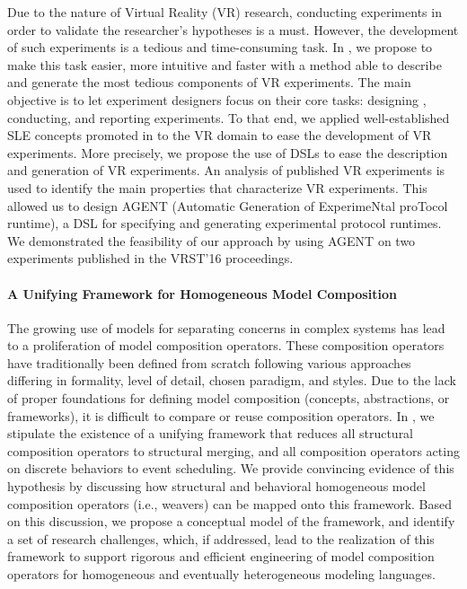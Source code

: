 Due to the nature of Virtual Reality (VR) research, conducting experiments in order to validate the researcher's hypotheses is a must. 
However, the development of such experiments is a tedious and time-consuming task. 
In \cite{lemoulec:hal-01549042}, we propose to make this task easier, more intuitive and faster with a method able to describe and generate the most tedious components of VR experiments. 
The main objective is to let experiment designers focus on their core tasks: designing , conducting, and reporting experiments. 
To that end, we applied well-established SLE concepts promoted in \team{} to the VR domain to ease the development of VR experiments.
More precisely, we propose the use of DSLs to ease the description and generation of VR experiments. 
An analysis of published VR experiments is used to identify the main properties that characterize VR experiments. 
This allowed us to design AGENT (Automatic Generation of ExperimeNtal proTocol runtime), a DSL for specifying and generating experimental protocol runtimes. 
We demonstrated the feasibility of our approach by using AGENT on two experiments published in the VRST'16 proceedings. 

\paragraph{A Unifying Framework for Homogeneous Model Composition}

The growing use of models for separating concerns in complex systems has lead to a proliferation of model composition operators. These composition operators have traditionally been defined from scratch following various approaches differing in formality, level of detail, chosen paradigm, and styles. Due to the lack of proper foundations for defining model composition (concepts, abstractions, or frameworks), it is difficult to compare or reuse composition operators. In \cite{kienzle:hal-01949050}, we stipulate the existence of a unifying framework that reduces all structural composition operators to structural merging, and all composition operators acting on discrete behaviors to event scheduling. We provide convincing evidence of this hypothesis by discussing how structural and behavioral homogeneous model composition operators (i.e., weavers) can be mapped onto this framework. Based on this discussion, we propose a conceptual model of the framework, and identify a set of research challenges, which, if addressed, lead to the realization of this framework to support rigorous and efficient engineering of model composition operators for homogeneous and eventually heterogeneous modeling languages.

